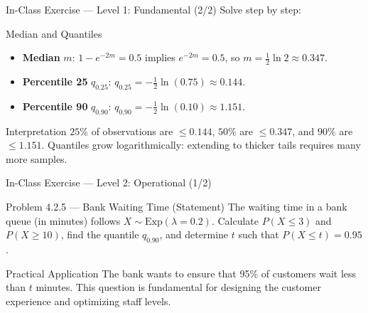 \documentclass[aspectratio=169,xcolor={dvipsnames,table}]{beamer}
\begin{document}
\begin{frame}{In-Class Exercise --- Level 1: Fundamental (2/2)}
	\vspace{-0.05cm}
	\scriptsize
	Solve step by step: \pause
	\begin{block}{Median and Quantiles}
		\begin{itemize}\itemsep=0.05cm
			\item \textbf{Median} $m$: $1 - e^{-2m} = 0.5$ implies $e^{-2m} = 0.5$, so $m = \frac{1}{2}\ln 2 \approx 0.347$. \pause
			\item \textbf{Percentile 25} $q_{0.25}$: $q_{0.25} = -\frac{1}{2}\ln(0.75) \approx 0.144$. \pause
			\item \textbf{Percentile 90} $q_{0.90}$: $q_{0.90} = -\frac{1}{2}\ln(0.10) \approx 1.151$.
		\end{itemize}
	\end{block}
	\vspace{0.05cm}
	\pause
	\begin{alertblock}{Interpretation}
		\scriptsize
		$25\%$ of observations are $\le 0.144$, $50\%$ are $\le 0.347$, and $90\%$ are $\le 1.151$. Quantiles grow logarithmically: extending to thicker tails requires many more samples.
	\end{alertblock}
\end{frame}

\begin{frame}{In-Class Exercise --- Level 2: Operational (1/2)}
	\vspace{-0.1cm}
	\begin{block}{Problem 4.2.5 --- Bank Waiting Time (Statement)}
		The waiting time in a bank queue (in minutes) follows $X \sim \text{Exp}(\lambda = 0.2)$. Calculate $P(X \le 3)$ and $P(X \ge 10)$, find the quantile $q_{0.90}$, and determine $t$ such that $P(X \le t) = 0.95$.
	\end{block}
	\vspace{0.15cm}
	\pause
	\begin{alertblock}{Practical Application}
		\scriptsize
		The bank wants to ensure that 95\% of customers wait less than $t$ minutes. This question is fundamental for designing the customer experience and optimizing staff levels.
	\end{alertblock}
\end{frame}
\end{document}
